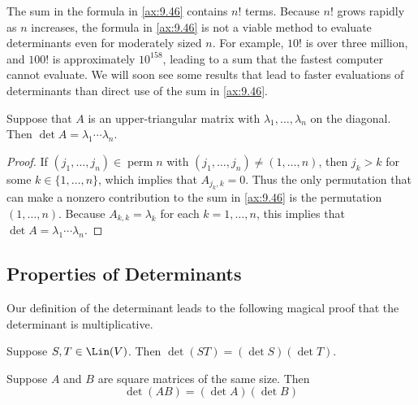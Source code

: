 The sum in the formula in \ref{ax:9.46} contains $n!$ terms. Because $n!$ grows
rapidly as $n$ increases, the formula in \ref{ax:9.46} is not a viable method
to evaluate determinants even for moderately sized $n$. For example, $10!$ is
over three million, and $100!$ is approximately $10^{158}$, leading to a sum
that the fastest computer cannot evaluate. We will soon see some results that
lead to faster evaluations of determinants than direct use of the sum in
\ref{ax:9.46}.

\begin{result}\label{ax:9.48}
Suppose that $A$ is an upper-triangular matrix with
$\lambda_1,\dots,\lambda_n$ on the diagonal. Then
$\det A=\lambda_1\cdots\lambda_n$.
\end{result}

\begin{proof}
If $(j_1,\dots,j_n)\in\operatorname{perm} n$ with
$(j_1,\dots,j_n)\ne(1,\dots,n)$, then $j_k>k$ for some $k\in\{1,\dots,n\}$,
which implies that $A_{j_k,k}=0$. Thus the only permutation that can make a
nonzero contribution to the sum in \ref{ax:9.46} is the permutation
$(1,\dots,n)$. Because $A_{k,k}=\lambda_k$ for each $k=1,\dots,n$, this implies
that $\det A=\lambda_1\cdots\lambda_n$.
\end{proof}

\subsection{Properties of Determinants}

Our definition of the determinant leads to the following magical proof that
the determinant is multiplicative.

\begin{result}\label{ax:9.49}\leavevmode
\begin{parts}
\item Suppose $S,T\in\Lin(V)$. Then $\det(ST)=(\det S)(\det T)$.
\item Suppose $A$ and $B$ are square matrices of the same size. Then
  \[ \det(AB) = (\det A)(\det B) \]
\end{parts}
\end{result}

